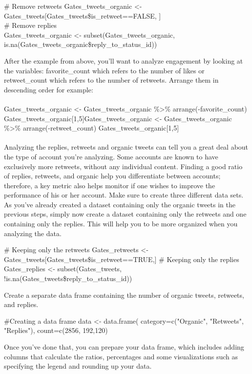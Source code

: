 \begin{flushleft}
	\# Remove retweets
	Gates\_tweets\_organic <- Gates\_tweets[Gates\_tweets\$is\_retweet==FALSE, ]\\ 
	\# Remove replies\\
	Gates\_tweets\_organic <- subset(Gates\_tweets\_organic, is.na(Gates\_tweets\_organic\$reply\_to\_status\_id))
\\
\end{flushleft}
After the example from above, you’ll want to analyze engagement by looking at the variables: favorite\_count which refers to the number of likes or retweet\_count which refers to the number of retweets. Arrange them in descending order for example:
\\
\\
Gates\_tweets\_organic <- Gates\_tweets\_organic \%>\% arrange(-favorite\_count)
Gates\_tweets\_organic[1,5]Gates\_tweets\_organic <- Gates\_tweets\_organic \%>\% arrange(-retweet\_count)
Gates\_tweets\_organic[1,5]
\\
\\
Analyzing the replies, retweets and organic tweets can tell you a great deal about the type of account you’re analyzing. Some accounts are known to have exclusively more retweets, without any individual content. Finding a good ratio of replies, retweets, and organic help you differentiate between accounts; therefore, a key metric also helps monitor if one wishes to improve the performance of his or her account.
Make sure to create three different data sets. As you’ve already created a dataset containing only the organic tweets in the previous steps, simply now create a dataset containing only the retweets and one containing only the replies. This will help you to be more organized when you analyzing the data.
\begin{flushleft}
	\# Keeping only the retweets
	Gates\_retweets <- Gates\_tweets[Gates\_tweets\$is\_retweet==TRUE,]
	\# Keeping only the replies
	Gates\_replies <- subset(Gates\_tweets, !is.na(Gates\_tweets\$reply\_to\_status\_id))
\\
\end{flushleft}
Create a separate data frame containing the number of organic tweets, retweets, and replies. 
\begin{flushleft}
	\#Creating a data frame
	data <- data.frame(
	category=c("Organic", "Retweets", "Replies"),
	count=c(2856, 192,120)
\end{flushleft}
Once you’ve done that, you can prepare your data frame, which includes adding columns that calculate the ratios, percentages and some visualizations such as specifying the legend and rounding up your data.
